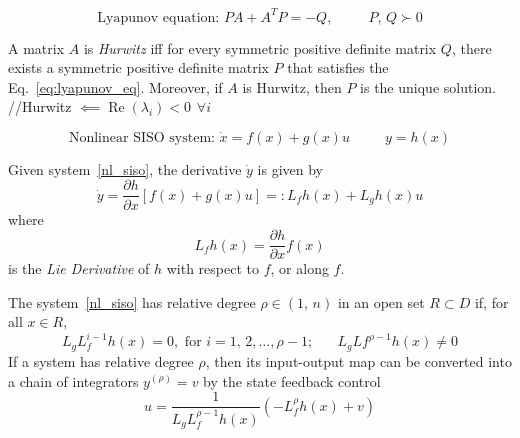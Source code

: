 \documentclass[twocolumn]{article}    %
\begin{document}
\begin{equation} \label{eq:lyapunov_eq}
    \text{Lyapunov equation: } PA+A^TP=-Q, \hspace{30pt} P,\,Q \succ 0
\end{equation}

\begin{remark}[3.7, pg 72]
    A matrix \(A\) is \emph{Hurwitz} iff for every symmetric positive definite matrix \(Q\), there exists a symmetric positive definite matrix \(P\) that satisfies the Eq.~\eqref{eq:lyapunov_eq}. Moreover, if \(A\) is Hurwitz, then \(P\) is the unique solution. 
    //Hurwitz \(\impliedby \operatorname{Re}(\lambda_i)< 0 \hspace{5pt} \forall i\)
\end{remark}
\begin{equation} \label{nl_siso}
    \text{Nonlinear SISO system: } \dot{x} = f(x) + g(x)u \hspace{30pt} y = h(x)
\end{equation}

\begin{definition}
    Given system~\eqref{nl_siso}, the derivative \(\dot{y}\) is given by
    \begin{equation*}
        \dot{y} = \frac{\partial h}{\partial x}[f(x) + g(x)u] =: L_fh(x) + L_gh(x)u
    \end{equation*}
    where
    \begin{equation*}
        L_fh(x) = \frac{\partial h}{\partial x} f(x)
    \end{equation*}
    is the \emph{Lie Derivative} of \(h\) with respect to \(f\), or along \(f\).
\end{definition}

\begin{definition}
    The system~\eqref{nl_siso} has relative degree \(\rho \in (1,\,n)\) in an open set \(R \subset D\) if, for all \(x \in R\),
    \begin{equation*}
        L_gL_f^{i-1}h(x) = 0, \text{ for } i = 1,\,2,\dots,\rho-1; \hspace{20pt} L_gLf^{\rho-1}h(x) \neq 0
    \end{equation*}
    If a system has relative degree \(\rho\), then its input-output map can be converted into a chain of integrators \(y^{(\rho)} = v\) by the state feedback control
    \begin{equation*}
        u = \frac{1}{L_gL_f^{\rho-1}h(x)} \left( -L_f^\rho h(x) + v \right)
    \end{equation*}
\end{definition}
\end{document}
